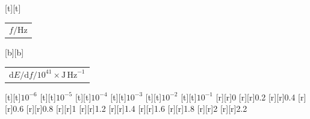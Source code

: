 %    
%
%
\begin{psfrags}%
\psfragscanon%
%
[t][t]{\color[rgb]{0,0,0}\setlength{\tabcolsep}{0pt}\begin{tabular}{c}$f/\mathrm{Hz}$\end{tabular}}%
[b][b]{\color[rgb]{0,0,0}\setlength{\tabcolsep}{0pt}\begin{tabular}{c}$\mathrm{d}E/\mathrm{d}{f}/10^{41} \times \mathrm{J\,Hz}^{-1}$\end{tabular}}%
%
[t][t]{$10^{-6}$}%
[t][t]{$10^{-5}$}%
[t][t]{$10^{-4}$}%
[t][t]{$10^{-3}$}%
[t][t]{$10^{-2}$}%
[t][t]{$10^{-1}$}%
%
[r][r]{0}%
[r][r]{0.2}%
[r][r]{0.4}%
[r][r]{0.6}%
[r][r]{0.8}%
[r][r]{1}%
[r][r]{1.2}%
[r][r]{1.4}%
[r][r]{1.6}%
[r][r]{1.8}%
[r][r]{2}%
[r][r]{2.2}%
%
%
\end{psfrags}%
%
